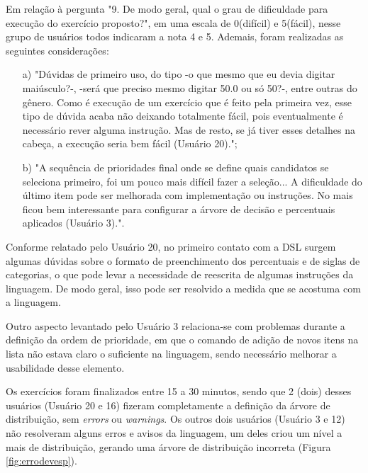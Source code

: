 Em relação à pergunta "9. De modo geral, qual o grau de dificuldade para execução do exercício proposto?", em uma escala de 0(difícil) e 5(fácil), nesse grupo de usuários todos indicaram a nota 4 e 5. Ademais, foram realizadas as seguintes considerações:

\begin{enumerate}
    \item [a)] "Dúvidas de primeiro uso, do tipo -o que  mesmo que eu devia digitar maiúsculo?-, -será que preciso mesmo digitar 50.0 ou só 50?-,  entre outras do gênero. Como é execução de um exercício que é feito pela primeira vez, esse tipo de dúvida acaba não deixando totalmente fácil, pois eventualmente é necessário rever alguma instrução. Mas de resto, se já tiver esses detalhes na cabeça, a execução seria bem fácil (Usuário 20).";
    
    \item[b)] "A sequência de prioridades final onde se define quais candidatos se seleciona primeiro, foi um pouco mais difícil fazer a seleção... A dificuldade do último item pode ser melhorada com implementação ou instruções. No mais ficou bem interessante para configurar a árvore de decisão e percentuais aplicados (Usuário 3).".
\end{enumerate}

Conforme relatado pelo Usuário 20, no primeiro contato com a DSL surgem algumas dúvidas sobre o formato de preenchimento dos percentuais e de siglas de categorias, o que pode levar a necessidade de reescrita de algumas instruções da linguagem. De modo geral, isso pode ser resolvido a medida que se acostuma com a linguagem.

Outro aspecto levantado pelo Usuário 3 relaciona-se com problemas durante a definição da ordem de prioridade, em que o comando de adição de novos itens na lista não estava claro o suficiente na linguagem, sendo necessário melhorar a usabilidade desse elemento.

Os exercícios foram finalizados entre 15 a 30 minutos, sendo que 2 (dois) desses usuários (Usuário 20 e 16) fizeram completamente a definição da árvore de distribuição, sem \textit{errors} ou \textit{warnings}. Os outros dois usuários (Usuário 3 e 12) não resolveram alguns erros e avisos da linguagem, um deles criou um nível a mais de distribuição, gerando uma árvore de distribuição incorreta (Figura \ref{fig:errodevesp}). 






